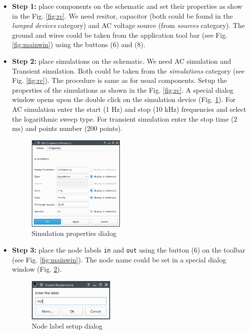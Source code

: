 \documentclass[a4paper,12pt]{article}
\begin{document}
\begin{itemize}
 \item \textbf{Step 1:} place components on the schematic and set their properties as show in the Fig. \ref{fig:rc}. We need resitor, capacitor (both could be found in the \emph{lumped devices} category) and AC voltage source (from \emph{sources} category). The ground and wires could be taken from the application tool bar (see Fig. \ref{fig:mainwin}) using the buttons (6) and (8). 
 
 \item \textbf{Step 2:} place simulations on the schematic. We need AC simulation and Transient simulation. Both could be taken from the \emph{simulations} category (see Fig. \ref{fig:rc}). The procedure is same as for usual components. Setup the properties of the simulations as shown in the Fig. \ref{fig:rc}. A special dialog window opens upon the double click on the simulation device (Fig. \ref{fig:dlg_sim}). For AC simulation enter the start (1 Hz) and stop (10 kHz) frequencies and select the logarithmic sweep type. For transient simulation enter the stop time (2 ms) and points number (200 points). 
 \begin{figure}[!ht]
  \begin{center}
    \includegraphics[width=0.45\textwidth]{img/dlg_sim.png}
  \end{center}
  \caption{Simulation properties dialog} \label{fig:dlg_sim}
\end{figure}
 
 \pagebreak[4]
 
 \item \textbf{Step 3:} place the node labels \verb|in| and \verb|out| using the button (6) on the toolbar (see Fig. \ref{fig:mainwin}). The node name could be set in a special dialog window (Fig. \ref{fig:nod_lbl}). 
 \begin{figure}[!ht]
  \begin{center}
    \includegraphics[width=0.4\textwidth]{img/nod_lbl.png}
  \end{center}
  \caption{Node label setup dialog} \label{fig:nod_lbl}
\end{figure}
 

\end{itemize}
\end{document}
